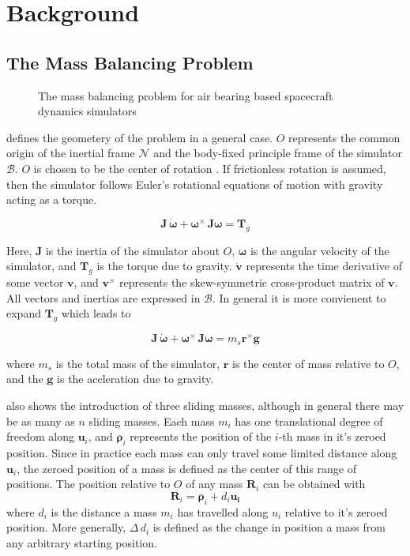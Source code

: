 \chapter{Background}\label{chap:background}
\section{The Mass Balancing Problem}

\begin{figure}
    \centering
    
    \caption{The mass balancing problem for air bearing based spacecraft dynamics simulators}
    \label{fig:mbs_problem}
\end{figure}


 defines the geometery of the problem in a general case. $O$ represents the common origin of the inertial frame $\mathcal{N}$ and the body-fixed principle frame of the simulator $\mathcal{B}$. $O$ is chosen to be the center of rotation . If frictionless rotation is assumed, then the simulator follows Euler's rotational equations of motion with gravity acting as a torque. 

\begin{equation}
    \bm{J}\,\dot{\bm{\omega}} + \bm{\omega}^{\times}\,\bm{J}\bm{\omega} = \bm{T}_g
\end{equation}

Here, $\bm{J}$ is the inertia of the simulator about $O$, $\bm{\omega}$ is the angular velocity of the simulator, and $\bm{T}_g$ is the torque due to gravity. $\dot{\bm{v}}$ represents the time derivative of some vector $\bm{v}$, and $\bm{v}^{\times}$ represents the skew-symmetric cross-product matrix of $\bm{v}$. All vectors and inertias are expressed in $\mathcal{B}$. In general it is more convienent to expand $\bm{T}_g$ which leads to

\begin{equation}\label{equation:starting_eom}
    \bm{J}\,\dot{\bm{\omega}} + \bm{\omega}^{\times}\,\bm{J}\bm{\omega} = m_s\bm{r}^{\times}\bm{g}
\end{equation}

where $m_s$ is the total mass of the simulator, $\bm{r}$ is the center of mass relative to $O$, and the $\bm{g}$ is the accleration due to gravity.

 also shows the introduction of three sliding masses, although in general there may be as many as $n$ sliding masses. Each mass $m_i$ has one translational degree of freedom along $\bm{u}_i$, and $\bm{\rho}_i$ represents the position of the $i$-th mass in it's zeroed position. Since in practice each mass can only travel some limited distance along $\bm{u}_i$, the zeroed position of a mass is defined as the center of this range of positions. The position relative to $O$ of any mass $\bm{R}_i$ can be obtained with 
\begin{equation}\label{equation:sliding masses}
    \bm{R}_i = \bm{\rho}_i + d_i\bm{u_i}
\end{equation}
where $d_i$ is the distance a mass $m_i$ has travelled along $u_i$ relative to it's zeroed position. More generally, $\Delta\,d_i$ is defined as the change in position a mass from any arbitrary starting position.

